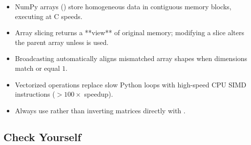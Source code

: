 \begin{takeaways}
\begin{itemize}
    \item NumPy arrays () store homogeneous data in contiguous memory blocks, executing at C speeds.
    \item Array slicing returns a **view** of original memory; modifying a slice alters the parent array unless  is used.
    \item Broadcasting automatically aligns mismatched array shapes when dimensions match or equal $1$.
    \item Vectorized operations replace slow Python loops with high-speed CPU SIMD instructions ($> 100\times$ speedup).
    \item Always use  rather than inverting matrices directly with .
\end{itemize}
\end{takeaways}

\subsection{Check Yourself}

